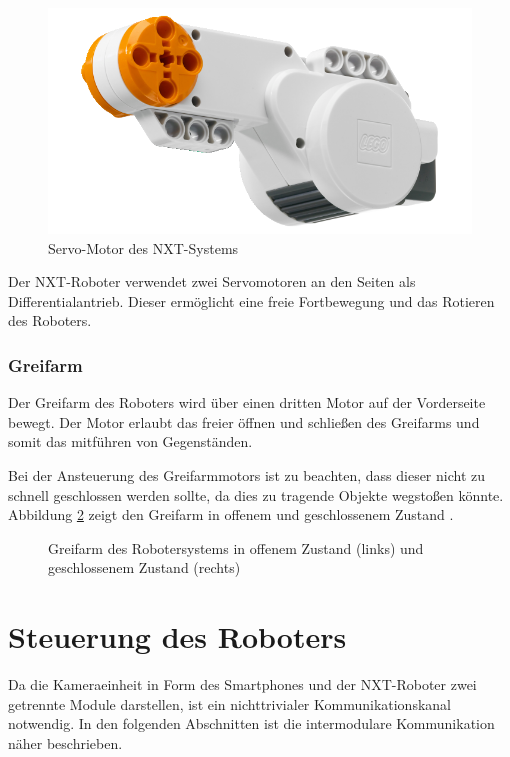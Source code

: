 \begin{figure}[h]
\centering
\includegraphics[width=\textwidth/3]{Bilder/Robot/motor}
\caption{Servo-Motor des NXT-Systems}
\label{fig:motor}
\end{figure}

Der NXT-Roboter verwendet zwei Servomotoren an den Seiten als Differentialantrieb. Dieser ermöglicht eine freie Fortbewegung und das Rotieren des Roboters. 

\subsubsection{Greifarm}
\label{greifarm}
Der Greifarm des Roboters wird über einen dritten Motor auf der Vorderseite bewegt. Der Motor erlaubt das freier öffnen und schließen des Greifarms und somit das mitführen von Gegenständen. 

Bei der Ansteuerung des Greifarmmotors ist zu beachten, dass dieser nicht zu schnell geschlossen werden sollte, da dies zu tragende Objekte wegstoßen könnte. Abbildung \ref{fig:Greifarm} zeigt den Greifarm in offenem und geschlossenem Zustand .

\begin{figure}[h]
\centering
{}
\caption[Greifarm des Robotersystems]{Greifarm des Robotersystems in offenem Zustand (links) und geschlossenem Zustand (rechts)}
\label{fig:Greifarm}
\end{figure}

\section{Steuerung des Roboters}
\label{sec:RoboterSteuerung}

Da die Kameraeinheit in Form des Smartphones und der NXT-Roboter zwei getrennte Module darstellen, ist ein nichttrivialer Kommunikationskanal notwendig. In den folgenden Abschnitten ist die intermodulare Kommunikation näher beschrieben.

